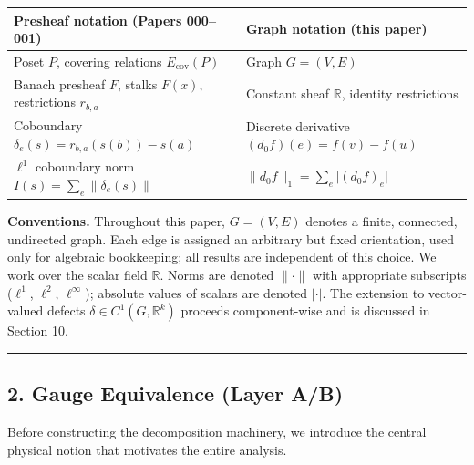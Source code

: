 \documentclass[
]{article}
\begin{document}
\begin{longtable}[]{@{}
  >{\raggedright\arraybackslash}p{}
  >{\raggedright\arraybackslash}p{}@{}}
\toprule\noalign{}
\begin{minipage}[b]{\linewidth}\raggedright
Presheaf notation (Papers 000--001)
\end{minipage} & \begin{minipage}[b]{\linewidth}\raggedright
Graph notation (this paper)
\end{minipage} \\
\midrule\noalign{}
\endhead
\bottomrule\noalign{}
\endlastfoot
Poset \(P\), covering relations \(E_{\mathrm{cov}}(P)\) & Graph
\(G = (V, E)\) \\
Banach presheaf \(F\), stalks \(F(x)\), restrictions \(r_{b,a}\) &
Constant sheaf \(\mathbb{R}\), identity restrictions \\
Coboundary \(\delta_e(s) = r_{b,a}(s(b)) - s(a)\) & Discrete derivative
\((d_0 f)(e) = f(v) - f(u)\) \\
\(\ell^1\) coboundary norm \(I(s) = \sum_e \lVert\delta_e(s)\rVert\) &
\(\lVert d_0 f \rVert_1 = \sum_e \lvert (d_0 f)_e \rvert\) \\
\end{longtable}

\textbf{Conventions.} Throughout this paper, \(G = (V,E)\) denotes a
finite, connected, undirected graph. Each edge is assigned an arbitrary
but fixed orientation, used only for algebraic bookkeeping; all results
are independent of this choice. We work over the scalar field
\(\mathbb{R}\). Norms are denoted \(\lVert \cdot \rVert\) with
appropriate subscripts (\(\ell^1\), \(\ell^2\), \(\ell^\infty\));
absolute values of scalars are denoted \(|\cdot|\). The extension to
vector-valued defects \(\delta \in C^1(G, \mathbb{R}^k)\) proceeds
component-wise and is discussed in Section 10.

\begin{center}\rule{0.5\linewidth}{0.5pt}\end{center}

\subsection{\texorpdfstring{2. Gauge Equivalence \textbf{(Layer
A/B)}}{2. Gauge Equivalence (Layer A/B)}}\label{gauge-equivalence-layer-ab}

Before constructing the decomposition machinery, we introduce the
central physical notion that motivates the entire analysis.
\end{document}
